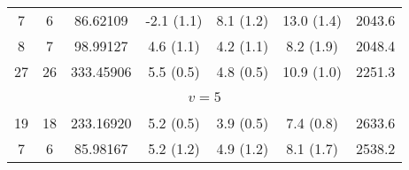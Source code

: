 \begin{table*}[htp]
\begin{tabular}{ccccccc}
 7 & 6 & 86.62109 & -2.1 (1.1) & 8.1 (1.2) & 13.0 (1.4) & 2043.6 \\
 8 & 7 & 98.99127 & 4.6 (1.1) & 4.2 (1.1) & 8.2 (1.9) & 2048.4 \\
 27 & 26 & 333.45906 & 5.5 (0.5) & 4.8 (0.5) & 10.9 (1.0) & 2251.3 \\
\hline
&\vspace{-0.75em}\\
\multicolumn{7}{c}{$v = 5$} \\
\vspace{-0.75em}\\
 19 & 18 & 233.16920 & 5.2 (0.5) & 3.9 (0.5) & 7.4 (0.8) & 2633.6 \\
 7 & 6 & 85.98167 & 5.2 (1.2) & 4.9 (1.2) & 8.1 (1.7) & 2538.2 \\
\end{tabular}

\par 
\end{table*}
